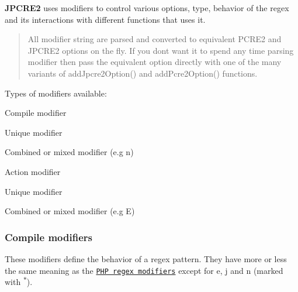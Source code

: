 {\bfseries J\+P\+C\+R\+E2} uses modifiers to control various options, type, behavior of the regex and its\textquotesingle{} interactions with different functions that uses it.

\begin{quote}
All modifier string are parsed and converted to equivalent P\+C\+R\+E2 and J\+P\+C\+R\+E2 options on the fly. If you don\textquotesingle{}t want it to spend any time parsing modifier then pass the equivalent option directly with one of the many variants of {\ttfamily add\+Jpcre2\+Option()} and {\ttfamily add\+Pcre2\+Option()} functions. \end{quote}


Types of modifiers available\+:


\begin{DoxyEnumerate}
\item Compile modifier
\begin{DoxyEnumerate}
\item Unique modifier
\item Combined or mixed modifier (e.\+g \textquotesingle{}n\textquotesingle{})
\end{DoxyEnumerate}
\item Action modifier
\begin{DoxyEnumerate}
\item Unique modifier
\item Combined or mixed modifier (e.\+g \textquotesingle{}E\textquotesingle{})
\end{DoxyEnumerate}
\end{DoxyEnumerate}\hypertarget{index_compile-modifier}{}\subsubsection{Compile modifiers}\label{index_compile-modifier}
These modifiers define the behavior of a regex pattern. They have more or less the same meaning as the \href{https://php.net/manual/en/reference.pcre.pattern.modifiers.php}{\tt P\+HP regex modifiers} except for {\ttfamily e, j and n} (marked with \textsuperscript{$\ast$}).

